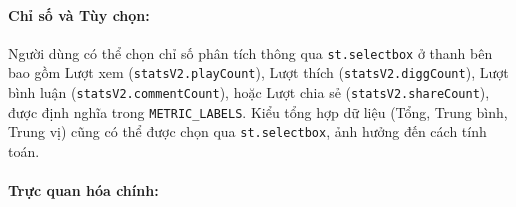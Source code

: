 \paragraph{Chỉ số và Tùy chọn:} Người dùng có thể chọn chỉ số phân tích thông qua \texttt{st.selectbox} ở thanh bên bao gồm Lượt xem (\texttt{statsV2.playCount}), Lượt thích (\texttt{statsV2.diggCount}), Lượt bình luận (\texttt{statsV2.commentCount}), hoặc Lượt chia sẻ (\texttt{statsV2.shareCount}), được định nghĩa trong \texttt{METRIC\_LABELS}. Kiểu tổng hợp dữ liệu (Tổng, Trung bình, Trung vị) cũng có thể được chọn qua \texttt{st.selectbox}, ảnh hưởng đến cách tính toán.

\paragraph{Trực quan hóa chính:}
